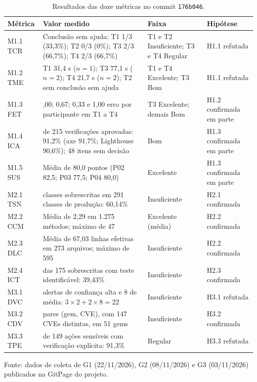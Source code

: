 \documentclass[journal]{IEEEtran}
\begin{document}
\begin{table}[!t]
\centering
\caption{Resultados das doze métricas no commit \texttt{176b046}.}
\label{tab:resultados}
\small
\begin{tabular}{@{}l >{\raggedright\arraybackslash}p{} >{\raggedright\arraybackslash}p{} >{\raggedright\arraybackslash}p{}@{}}
\toprule
\textbf{Métrica} & \textbf{Valor medido} & \textbf{Faixa} & \textbf{Hipótese} \\
\midrule
M1.1 TCR & Conclusão sem ajuda: T1 1/3 (33,3\%); T2 0/3 (0\%); T3 2/3 (66,7\%); T4 2/3 (66,7\%) & T1 e T2 Insuficiente; T3 e T4 Regular & H1.1 refutada \\
M1.2 TME & T1 31,4 s ($n=1$); T3 77,1 s ($n=2$); T4 21,7 s ($n=2$); T2 sem conclusão sem ajuda & T1 e T4 Excelente; T3 Bom & H1.1 refutada \\
M1.3 FET & 1,00; 0,67; 0,33 e 1,00 erro por participante em T1 a T4 & T3 Excelente; demais Bom & H1.2 confirmada em parte \\
M1.4 ICA & 196 de 215 verificações aprovadas: 91,2\% (axe 91,7\%; Lighthouse 90,6\%); 48 itens sem decisão & Bom & H1.3 confirmada em parte \\
M1.5 SUS & Média de 80,0 pontos (P02 82,5; P03 77,5; P04 80,0) & Excelente & H1.3 confirmada em parte \\
\midrule
M2.1 TSN & 175 classes sobrescritas em 291 classes de produção: 60,14\% & Insuficiente & H2.1 confirmada \\
M2.2 CCM & Média de 2,29 em 1.275 métodos; máximo de 47 & Excelente (média) & H2.2 confirmada \\
M2.3 DLC & Média de 67,03 linhas efetivas em 273 arquivos; máximo de 595 & Insuficiente & H2.2 confirmada \\
M2.4 ICT & 69 das 175 sobrescritas com teste identificável: 39,43\% & Insuficiente & H2.3 confirmada \\
\midrule
M3.1 DVC & 2 alertas de confiança alta e 8 de média: $3 \times 2 + 2 \times 8 = 22$ & Insuficiente & H3.1 refutada \\
M3.2 CDV & 156 pares (gem, CVE), com 147 CVEs distintas, em 51 gems & Insuficiente & H3.2 confirmada \\
M3.3 TPE & 136 de 149 ações sensíveis com verificação explícita: 91,3\% & Regular & H3.3 refutada \\
\bottomrule
\end{tabular}

\vspace{2pt}
{\footnotesize Fonte: dados de coleta de G1 (22/11/2026), G2 (08/11/2026) e G3 (03/11/2026) publicados na GitPage do projeto.}
\end{table}
\end{document}
